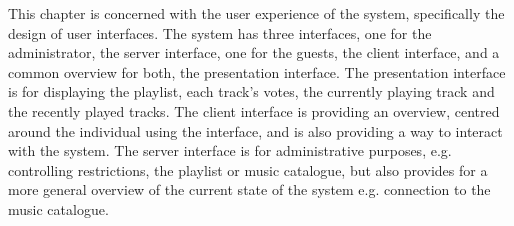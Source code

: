 This chapter is concerned with the user experience of the system, specifically the design of user interfaces.
The system has three interfaces, one for the administrator, the server interface, one for the guests, the client interface, and a common overview for both, the presentation interface.
The presentation interface is for displaying the playlist, each track's votes, the currently playing track and the recently played tracks.
The client interface is providing an overview, centred around the individual using the interface, and is also providing a way to interact with the system.
The server interface is for administrative purposes, e.g. controlling restrictions, the playlist or music catalogue, but also provides for a more general overview of the current state of the system e.g. connection to the music catalogue.
